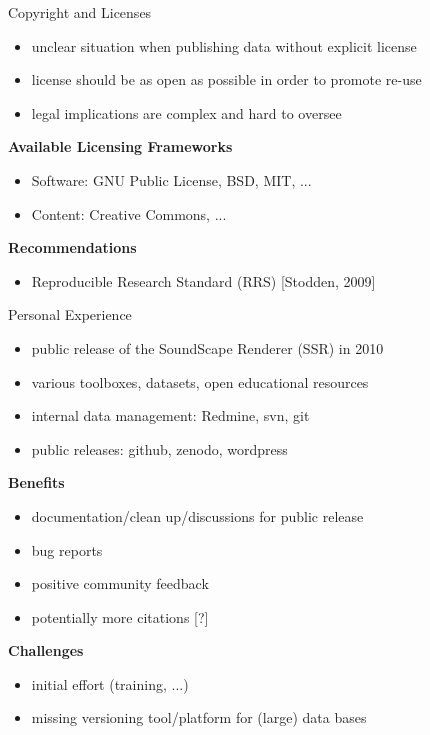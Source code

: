 \documentclass{beamer}
\begin{document}
\begin{frame}{Copyright and Licenses}


\begin{itemize}
\item unclear situation when publishing data without explicit license
\item license should be as open as possible in order to promote re-use
\item legal implications are complex and hard to oversee
\end{itemize}

\vfill

\textbf{Available Licensing Frameworks}
\begin{itemize}
\item Software: GNU Public License, BSD, MIT, ...
\item Content: Creative Commons, ...
\end{itemize}

\textbf{Recommendations}
\begin{itemize}
\item Reproducible Research Standard (RRS) [Stodden, 2009]
\end{itemize}

\end{frame}


\begin{frame}{Personal Experience}

\begin{itemize}
\item public release of the SoundScape Renderer (SSR) in 2010
\item various toolboxes, datasets, open educational resources
\item internal data management: Redmine, svn, git
\item public releases: github, zenodo, wordpress
\end{itemize}

\vfill

\textbf{Benefits}
\begin{itemize}
\item documentation/clean up/discussions for public release
\item bug reports
\item positive community feedback
\item potentially more citations {\tiny [?]}
\end{itemize}

\textbf{Challenges}
\begin{itemize}
\item initial effort (training, ...)
\item missing versioning tool/platform for (large) data bases
\end{itemize}

\end{frame}
\end{document}
